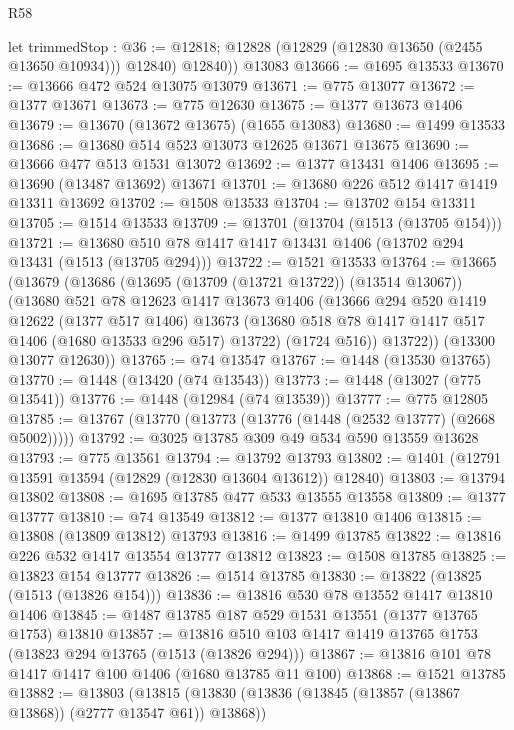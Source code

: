 \begin{lexlean}{R58}
\begin{coremodule}
{{        let trimmedStop : @36 := @12818;
        @12828 (@12829 (@12830 @13650 (@2455 @13650 @10934))) @12840)
        @12840))
    @13083
@13666 := @1695 @13533
@13670 := @13666 @472 @524 @13075 @13079
@13671 := @775 @13077
@13672 := @1377 @13671
@13673 := @775 @12630
@13675 := @1377 @13673 @1406
@13679 := @13670 (@13672 @13675) (@1655 @13083)
@13680 := @1499 @13533
@13686 := @13680 @514 @523 @13073 @12625 @13671 @13675
@13690 := @13666 @477 @513 @1531 @13072
@13692 := @1377 @13431 @1406
@13695 := @13690 (@13487 @13692) @13671
@13701 := @13680 @226 @512 @1417 @1419 @13311 @13692
@13702 := @1508 @13533
@13704 := @13702 @154 @13311
@13705 := @1514 @13533
@13709 := @13701 (@13704 (@1513 (@13705 @154)))
@13721 := @13680 @510 @78 @1417 @1417 @13431 @1406 (@13702 @294 @13431 (@1513 (@13705 @294)))
@13722 := @1521 @13533
@13764 := @13665
    (@13679
      (@13686
        (@13695 (@13709 (@13721 @13722)) (@13514 @13067))
        (@13680
          @521
          @78
          @12623
          @1417
          @13673
          @1406
          (@13666
            @294
            @520
            @1419
            @12622
            (@1377 @517 @1406)
            @13673
            (@13680 @518 @78 @1417 @1417 @517 @1406 (@1680 @13533 @296 @517) @13722)
            (@1724 @516))
          @13722))
      (@13300 @13077 @12630))
@13765 := @74 @13547
@13767 := @1448 (@13530 @13765)
@13770 := @1448 (@13420 (@74 @13543))
@13773 := @1448 (@13027 (@775 @13541))
@13776 := @1448 (@12984 (@74 @13539))
@13777 := @775 @12805
@13785 := @13767 (@13770 (@13773 (@13776 (@1448 (@2532 @13777) (@2668 @5002)))))
@13792 := @3025 @13785 @309 @49 @534 @590 @13559 @13628
@13793 := @775 @13561
@13794 := @13792 @13793
@13802 := @1401 (@12791 @13591 @13594 (@12829 (@12830 @13604 @13612)) @12840)
@13803 := @13794 @13802
@13808 := @1695 @13785 @477 @533 @13555 @13558
@13809 := @1377 @13777
@13810 := @74 @13549
@13812 := @1377 @13810 @1406
@13815 := @13808 (@13809 @13812) @13793
@13816 := @1499 @13785
@13822 := @13816 @226 @532 @1417 @13554 @13777 @13812
@13823 := @1508 @13785
@13825 := @13823 @154 @13777
@13826 := @1514 @13785
@13830 := @13822 (@13825 (@1513 (@13826 @154)))
@13836 := @13816 @530 @78 @13552 @1417 @13810 @1406
@13845 := @1487 @13785 @187 @529 @1531 @13551 (@1377 @13765 @1753) @13810
@13857 := @13816 @510 @103 @1417 @1419 @13765 @1753 (@13823 @294 @13765 (@1513 (@13826 @294)))
@13867 := @13816 @101 @78 @1417 @1417 @100 @1406 (@1680 @13785 @11 @100)
@13868 := @1521 @13785
@13882 := @13803
    (@13815
      (@13830 (@13836 (@13845 (@13857 (@13867 @13868)) (@2777 @13547 @61)) @13868))
}}
\end{coremodule}
\end{lexlean}
